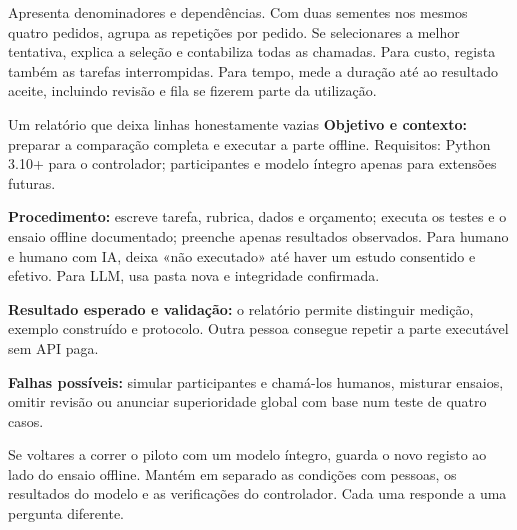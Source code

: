 Apresenta denominadores e dependências. Com duas sementes nos mesmos quatro pedidos, agrupa as repetições por pedido. Se selecionares a melhor tentativa, explica a seleção e contabiliza todas as chamadas. Para custo, regista também as tarefas interrompidas. Para tempo, mede a duração até ao resultado aceite, incluindo revisão e fila se fizerem parte da utilização.

\begin{promptlabbox}{Um relatório que deixa linhas honestamente vazias}
\textbf{Objetivo e contexto:} preparar a comparação completa e executar a parte offline. Requisitos: Python 3.10+ para o controlador; participantes e modelo íntegro apenas para extensões futuras.

\textbf{Procedimento:} escreve tarefa, rubrica, dados e orçamento; executa os testes e o ensaio offline documentado; preenche apenas resultados observados. Para humano e humano com IA, deixa «não executado» até haver um estudo consentido e efetivo. Para LLM, usa pasta nova e integridade confirmada.

\textbf{Resultado esperado e validação:} o relatório permite distinguir medição, exemplo construído e protocolo. Outra pessoa consegue repetir a parte executável sem API paga.

\textbf{Falhas possíveis:} simular participantes e chamá-los humanos, misturar ensaios, omitir revisão ou anunciar superioridade global com base num teste de quatro casos.
\end{promptlabbox}

Se voltares a correr o piloto com um modelo íntegro, guarda o novo registo ao lado do ensaio offline. Mantém em separado as condições com pessoas, os resultados do modelo e as verificações do controlador. Cada uma responde a uma pergunta diferente.
